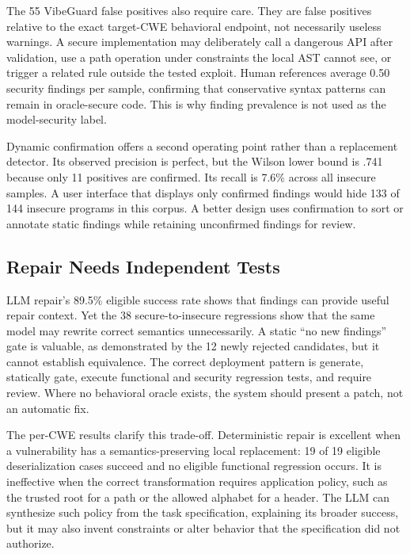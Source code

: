 \documentclass[sigconf,nonacm]{acmart}
\begin{document}
The 55 VibeGuard false positives also require care. They are false positives
relative to the exact target-CWE behavioral endpoint, not necessarily useless
warnings. A secure implementation may deliberately call a dangerous API after
validation, use a path operation under constraints the local AST cannot see,
or trigger a related rule outside the tested exploit. Human references average
0.50 security findings per sample, confirming that conservative syntax patterns
can remain in oracle-secure code. This is why finding prevalence is not used as
the model-security label.

Dynamic confirmation offers a second operating point rather than a replacement
detector. Its observed precision is perfect, but the Wilson lower bound is .741
because only 11 positives are confirmed. Its recall is 7.6\% across all
insecure samples. A user interface that displays only confirmed findings would
hide 133 of 144 insecure programs in this corpus. A better design uses
confirmation to sort or annotate static findings while retaining unconfirmed
findings for review.

\subsection{Repair Needs Independent Tests}

LLM repair's 89.5\% eligible success rate shows that findings can provide useful
repair context. Yet the 38 secure-to-insecure regressions show that the same
model may rewrite correct semantics unnecessarily. A static ``no new findings''
gate is valuable, as demonstrated by the 12 newly rejected candidates, but it
cannot establish equivalence. The correct deployment pattern is generate,
statically gate, execute functional and security regression tests, and require
review. Where no behavioral oracle exists, the system should present a patch,
not an automatic fix.

The per-CWE results clarify this trade-off. Deterministic repair is excellent
when a vulnerability has a semantics-preserving local replacement: 19 of 19
eligible deserialization cases succeed and no eligible functional regression
occurs. It is ineffective when the correct transformation requires application
policy, such as the trusted root for a path or the allowed alphabet for a
header. The LLM can synthesize such policy from the task specification,
explaining its broader success, but it may also invent constraints or alter
behavior that the specification did not authorize.
\end{document}
